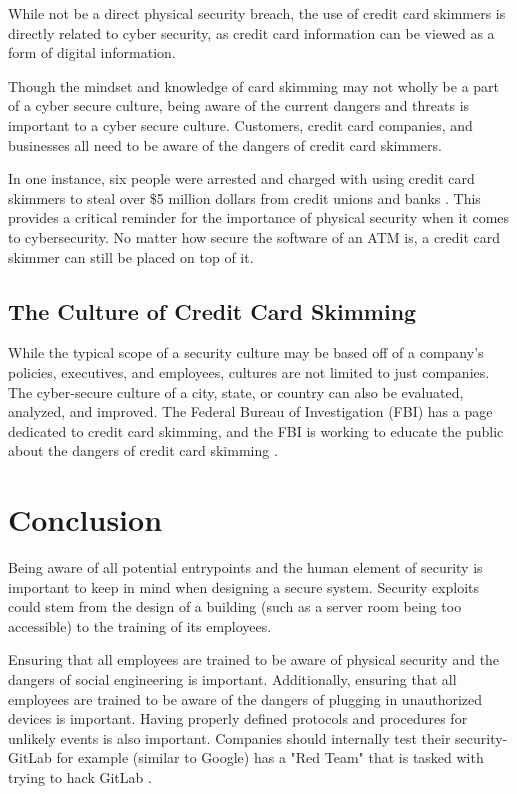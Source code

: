 \documentclass[acmsmall]{acmart}
\begin{document}
While not be a direct physical security breach, the use of credit card skimmers
is directly related to cyber security, as credit card information can be viewed
as a form of digital information.

Though the mindset and knowledge of card skimming may not wholly be a part of a
cyber secure culture, being aware of the current dangers and threats is important
to a cyber secure culture. Customers, credit card companies, and businesses all
need to be aware of the dangers of credit card skimmers.

In one instance, six people were arrested and charged with using credit card skimmers
to steal over \$5 million dollars from credit unions and banks \cite{FBISkimming}.
This provides a critical reminder for the importance of physical security when it comes
to cybersecurity. No matter how secure the software of an ATM is, a credit card skimmer
can still be placed on top of it.

\subsection{The Culture of Credit Card Skimming}
While the typical scope of a security culture may be based off of a company's
policies, executives, and employees, cultures are not limited to just companies.
The cyber-secure culture of a city, state, or country can also be evaluated,
analyzed, and improved. The Federal Bureau of Investigation (FBI) has a page
dedicated to credit card skimming, and the FBI is working to educate the public
about the dangers of credit card skimming \cite{FBISkimming}.

\section{Conclusion}
Being aware of all potential entrypoints and the human element of security is important
to keep in mind when designing a secure system. Security exploits could stem from the
design of a building (such as a server room being too accessible) to the training of
its employees.

Ensuring that all employees are trained to be aware of physical security and the dangers
of social engineering is important. Additionally, ensuring that all employees are trained
to be aware of the dangers of plugging in unauthorized devices is important. Having properly
defined protocols and procedures for unlikely events is also important.
Companies should internally test their security- GitLab for example (similar to Google) has a
"Red Team" that is tasked with trying to hack GitLab \cite{GitLab}.



\end{document}
